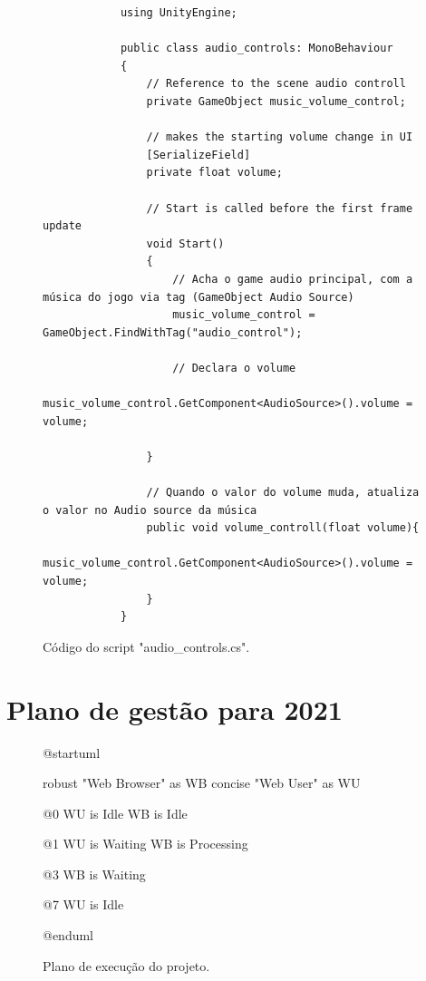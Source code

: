     \begin{figure}[ht!]
        \centering
        \begin{lstlisting}
            using UnityEngine;

            public class audio_controls: MonoBehaviour
            {
                // Reference to the scene audio controll 
                private GameObject music_volume_control;

                // makes the starting volume change in UI
                [SerializeField]
                private float volume;

                // Start is called before the first frame update
                void Start()
                {
                    // Acha o game audio principal, com a música do jogo via tag (GameObject Audio Source)
                    music_volume_control = GameObject.FindWithTag("audio_control");
                    
                    // Declara o volume 
                    music_volume_control.GetComponent<AudioSource>().volume = volume;

                }

                // Quando o valor do volume muda, atualiza o valor no Audio source da música
                public void volume_controll(float volume){
                    music_volume_control.GetComponent<AudioSource>().volume = volume;
                }
            }

        \end{lstlisting}
        \caption{Código do script "audio\_controls.cs".}
        \label{code:audiocontrol}

    \end{figure}



\chapter{Plano de gestão para 2021}


\begin{figure}[h!]
    \centering
        \begin{plantuml}
            @startuml

                robust "Web Browser" as WB
                concise "Web User" as WU

                @0
                WU is Idle
                WB is Idle

                @1
                WU is Waiting
                WB is Processing

                @3
                WB is Waiting

                @7
                WU is Idle

            @enduml
        \end{plantuml}
    \caption{Plano de execução do projeto.}
    \label{diagram:plano_de_execucao}
\end{figure}



